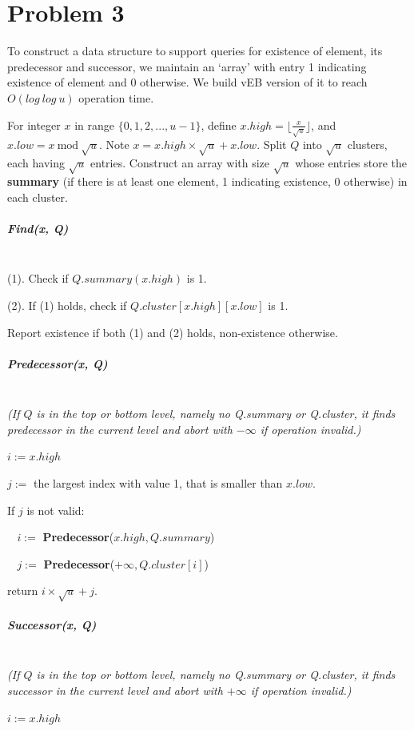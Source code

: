 \documentclass[12pt]{article}
\begin{document}
\pagebreak

\section*{Problem 3}
To construct a data structure to support queries for existence of element, its predecessor and successor, we maintain an `array' with entry 1 indicating existence of element and 0 otherwise. We build vEB version of it to reach $O(log\:log\:u)$ operation time. 

For integer $x$ in range $\{0, 1, 2, ..., u-1\}$, define $x.high = \lfloor \frac{x}{\sqrt{u}} \rfloor$, and $x.low = x\:\text{mod}\:\sqrt{u}$. Note $x = x.high \times \sqrt{u} + x.low$. Split $Q$ into $\sqrt{u}$ clusters, each having $\sqrt{u}$ entries. Construct an array with size $\sqrt{u}$ whose entries store the \textbf{summary} (if there is at least one element, 1 indicating existence, 0 otherwise) in each cluster.

\subparagraph{Find(x, Q)} 
~\\

(1). Check if $Q.summary(x.high)$ is 1.

(2). If (1) holds, check if $Q.cluster[x.high][x.low]$ is 1.

Report existence if both (1) and (2) holds, non-existence otherwise.

\subparagraph{Predecessor(x, Q)} 
~\\

\emph{(If $Q$ is in the top or bottom level, namely no Q.summary or Q.cluster, it finds predecessor in the current level and abort with $-\infty$ if operation invalid.)}

$i := x.high$

$j:=$ the largest index with value 1, that is smaller than $x.low$. 

If $j$ is not valid: 

$\:\:\:\:i:= $ \textbf{Predecessor}($x.high, Q.summary$)

$\:\:\:\:j:= $ \textbf{Predecessor}($+\infty, Q.cluster[i]$)

return $i \times \sqrt{u} + j$.

\subparagraph{Successor(x, Q)} 
~\\

\emph{(If $Q$ is in the top or bottom level, namely no Q.summary or Q.cluster, it finds successor in the current level and abort with $+\infty$ if operation invalid.)}

$i := x.high$
\end{document}
